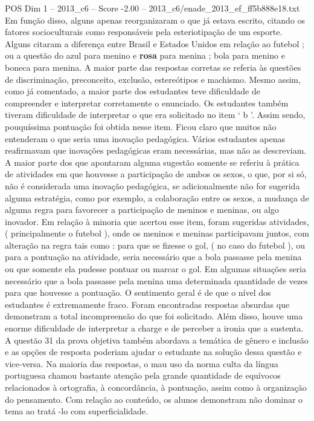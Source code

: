 \begin{textsample}{POS Dim 1 – 2013\_c6 – Score -2.00 – 2013\_c6/enade\_2013\_ef\_ff5b888e18.txt}
Em função disso, alguns apenas reorganizaram o que já estava escrito, citando os fatores socioculturais como responsáveis pela esteriotipação de um esporte.
Alguns citaram a diferença entre Brasil e Estados Unidos em relação ao futebol ; ou a questão do azul para menino e \textbf{rosa} para menina ; bola para menino e boneca para menina.
A maior parte das respostas corretas se referia às questões de discriminação, preconceito, exclusão, estereótipos e machismo.
Mesmo assim, como já comentado, a maior parte dos estudantes teve dificuldade de compreender e interpretar corretamente o enunciado.
Os estudantes também tiveram dificuldade de interpretar o que era solicitado no item ‘ b ’.
Assim sendo, pouquíssima pontuação foi obtida nesse item.
Ficou claro que muitos não entenderam o que seria uma inovação pedagógica.
Vários estudantes apenas reafirmavam que inovações pedagógicas eram necessárias, mas não as descreviam.
A maior parte dos que apontaram alguma sugestão somente se referiu à prática de atividades em que houvesse a participação de ambos os sexos, o que, por si só, não é considerada uma inovação pedagógica, se adicionalmente não for sugerida alguma estratégia, como por exemplo, a colaboração entre os sexos, a mudança de alguma regra para favorecer a participação de meninos e meninas, ou algo inovador.
Em relação à minoria que acertou esse item, foram sugeridas atividades, ( principalmente o futebol ), onde os meninos e meninas participavam juntos, com alteração na regra tais como : para que se fizesse o gol, ( no caso do futebol ), ou para a pontuação na atividade, seria necessário que a bola passasse pela menina ou que somente ela pudesse pontuar ou marcar o gol.
Em algumas situações seria necessário que a bola passasse pela menina uma determinada quantidade de vezes para que houvesse a pontuação.
O sentimento geral é de que o nível dos estudantes é extremamente fraco.
Foram encontradas respostas absurdas que demonstram a total incompreensão do que foi solicitado.
Além disso, houve uma enorme dificuldade de interpretar a charge e de perceber a ironia que a sustenta.
A questão 31 da prova objetiva também abordava a temática de gênero e inclusão e as opções de resposta poderiam ajudar o estudante na solução dessa questão e vice-versa.
Na maioria das respostas, o mau uso da norma culta da língua portuguesa chamou bastante atenção pela grande quantidade de equívocos relacionados à ortografia, à concordância, à pontuação, assim como à organização do pensamento.
Com relação ao conteúdo, os alunos demonstram não dominar o tema ao tratá -lo com superficialidade.

\end{textsample}
